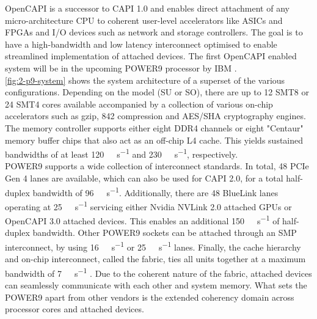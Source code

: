 
OpenCAPI \cite{opencapi-jeff-preso} is a successor to CAPI 1.0 \cite{capi_ibm} and enables direct attachment of any micro-architecture CPU to coherent user-level accelerators like ASICs and FPGAs and I/O devices such as network and storage controllers. The goal is to have a high-bandwidth and low latency interconnect optimised to enable streamlined implementation of attached devices. The first OpenCAPI enabled system will be in the upcoming POWER9 processor by IBM \cite{thompto-power9}.\\
\autoref{fig:2-p9-system} shows the system architecture of a superset of the various configurations. Depending on the model (SU or SO), there are up to 12 SMT8 or 24 SMT4 cores available accompanied by a collection of various on-chip accelerators such as gzip, 842 compression and AES/SHA cryptography engines. The memory controller supports either eight DDR4 channels or eight "Centaur" memory buffer chips that also act as an off-chip L4 cache. This yields sustained bandwidths of at least \SI{120}{\giga\byte\per\second} and \SI{230}{\giga\byte\per\second}, respectively.\\
POWER9 supports a wide collection of interconnect standards. In total, 48 PCIe Gen 4 lanes are available, which can also be used for CAPI 2.0, for a total half-duplex bandwidth of \SI{96}{\giga\byte\per\second}. Additionally, there are 48 BlueLink lanes operating at \SI{25}{\giga\bit\per\second} servicing either Nvidia NVLink 2.0 attached GPUs or OpenCAPI 3.0 attached devices. This enables an additional \SI{150}{\giga\byte\per\second} of half-duplex bandwidth. Other POWER9 sockets can be attached through an SMP interconnect, by using \SI{16}{\giga\bit\per\second} or \SI{25}{\giga\bit\per\second} lanes. Finally, the cache hierarchy and on-chip interconnect, called the fabric, ties all units together at a maximum bandwidth of \SI{7}{\tera\byte\per\second} \cite{stuecheli-power9}. Due to the coherent nature of the fabric, attached devices can seamlessly communicate with each other and system memory. What sets the POWER9 apart from other vendors is the extended coherency domain across processor cores and attached devices.


